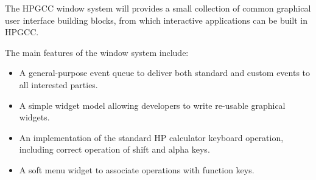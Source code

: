 The HPGCC window system will provides a small collection of common graphical user interface building blocks, from which interactive applications can be built in HPGCC.

The main features of the window system include:

\begin{itemize}
\item A general-purpose event queue to deliver both standard and custom events to all interested parties. \item A simple widget model allowing developers to write re-usable graphical widgets. \item An implementation of the standard HP calculator keyboard operation, including correct operation of shift and alpha keys. \item A soft menu widget to associate operations with function keys. \end{itemize}

